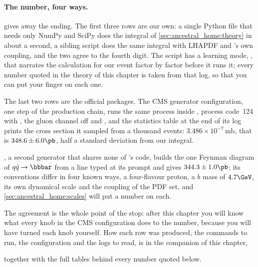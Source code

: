 \paragraph{The number, four ways.}
\label{sec:ancestral_home:validation}
 gives away the ending. The first
three rows are our own: a single Python file that needs only NumPy and SciPy
does the integral of \cref{sec:ancestral_home:theory} in about a second, a
sibling script does the same integral with LHAPDF and \PYTHIA's own coupling,
and the two agree to the fourth digit. The script has a learning mode,
, that narrates the calculation for our event factor by factor
before it runs it; every number quoted in the theory of this chapter is
taken from that log, so that you can put your finger on each one.
\label{sec:ancestral_home:standalone_code}\label{sec:ancestral_home:learning_mode}

The last two rows are the official packages. The CMS generator
configuration, one  step of the production chain, runs the same
process inside \PYTHIA, process code~124 with , the gluon channel off and , and the
statistics table at the end of its log prints the cross section it sampled
from a thousand events: $3.486\times10^{-7}\,\mathrm{mb}$, that is
$348.6\pm6.0\pb$, half a standard deviation from our integral.
\label{sec:ancestral_home:cmssw}

\MG, a second generator that shares none of \PYTHIA's code, builds the one
Feynman diagram of $q\bar q\to\bbbar$ from a line typed at its prompt and
gives $344.3\pm1.0\pb$; its conventions differ in four known ways, a
four-flavour proton, a $b$ mass of $4.7\GeV$, its own dynamical scale and
the coupling of the PDF set, and \cref{sec:ancestral_home:scales} will put a
number on each.
\label{sec:ancestral_home:madgraph}

The agreement is the whole point of the stop: after this chapter you will
know what every knob in the CMS configuration does to the number, because
you will have turned each knob yourself. How each row was produced, the
commands to run, the configuration and the logs to read, is in the
companion of this chapter,
\begin{center}
\end{center}
together with the full tables behind every number quoted below.

